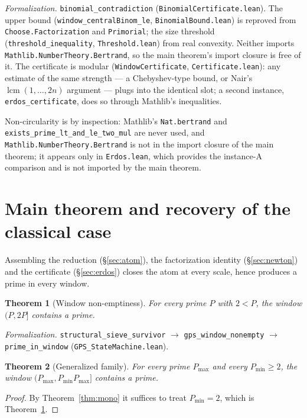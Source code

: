 \documentclass[11pt,a4paper]{amsart}
\theoremstyle{plain}
\newtheorem{theorem}{Theorem}[section]
\theoremstyle{definition}
\theoremstyle{plain}
\theoremstyle{remark}
\newcommand{\lean}[1]{\textup{\texttt{#1}}}
\newcommand{\Formal}[1]{\par\smallskip\noindent\emph{Formalization.} #1\par\smallskip}
\begin{document}
\Formal{\lean{binomial\_contradiction} (\lean{BinomialCertificate.lean}). The upper bound
(\lean{window\_centralBinom\_le}, \lean{BinomialBound.lean}) is reproved from
\lean{Choose.Factorization} and \lean{Primorial}; the size threshold
(\lean{threshold\_inequality}, \lean{Threshold.lean}) from real convexity. Neither imports
\lean{Mathlib.NumberTheory.Bertrand}, so the main theorem's import closure is free of it.
The certificate is modular (\lean{WindowCertificate}, \lean{Certificate.lean}): any estimate
of the same strength --- a Chebyshev-type bound, or Nair's $\operatorname{lcm}(1,\dots,2n)$
argument \cite{nair1982} --- plugs into the identical slot; a second instance,
\lean{erdos\_certificate}, does so through Mathlib's inequalities.}

Non-circularity is by inspection: Mathlib's \lean{Nat.bertrand} and
\lean{exists\_prime\_lt\_and\_le\_two\_mul} are never used, and
\lean{Mathlib.NumberTheory.Bertrand} is not in the import closure of the main theorem; it
appears only in \lean{Erdos.lean}, which provides the instance-A comparison and is not
imported by the main theorem.

\section{Main theorem and recovery of the classical case}
\label{sec:main}

Assembling the reduction (\S\ref{sec:atom}), the factorization identity (\S\ref{sec:newton})
and the certificate (\S\ref{sec:erdos}) closes the atom at every scale, hence produces a prime
in every window.

\begin{theorem}[Window non-emptiness]\label{thm:window}
For every prime $P$ with $2<P$, the window $(P,2P]$ contains a prime.
\end{theorem}

\Formal{\lean{structural\_sieve\_survivor} $\to$ \lean{gps\_window\_nonempty} $\to$
\lean{prime\_in\_window} (\lean{GPS\_StateMachine.lean}).}

\begin{theorem}[Generalized family]\label{thm:gen}
For every prime $P_{\max}$ and every $P_{\min}\ge2$, the window
$(P_{\max},P_{\min}P_{\max}]$ contains a prime.
\end{theorem}

\begin{proof}
By Theorem~\ref{thm:mono} it suffices to treat $P_{\min}=2$, which is
Theorem~\ref{thm:window}.
\end{proof}
\end{document}
